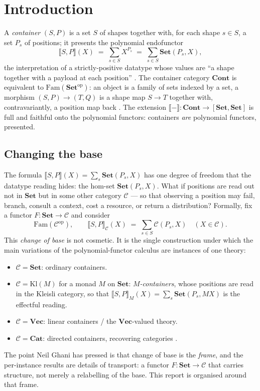 \documentclass[11pt]{amsart}
\theoremstyle{plain}
\theoremstyle{definition}
\theoremstyle{remark}
\newcommand{\Set}{\mathbf{Set}}
\newcommand{\Cont}{\mathbf{Cont}}
\newcommand{\Cat}{\mathbf{Cat}}
\newcommand{\Vect}{\mathbf{Vec}}
\newcommand{\Fam}{\mathrm{Fam}}
\newcommand{\Kl}{\mathrm{Kl}}
\newcommand{\op}{\mathrm{op}}
\newcommand{\ext}[1]{\llbracket #1 \rrbracket}
\newcommand{\extM}[1]{\llbracket #1 \rrbracket_{M}}
\newcommand{\extC}[1]{\llbracket #1 \rrbracket_{\C}}
\newcommand{\C}{\mathcal{C}}
\begin{document}
\section{Introduction}

A \emph{container} $(S,P)$ is a set $S$ of shapes together with, for each shape $s\in S$, a set $P_s$
of positions; it presents the polynomial endofunctor
\[
  \ext{S,P}(X) \;=\; \sum_{s\in S} X^{P_s} \;=\; \sum_{s\in S}\Set(P_s, X),
\]
the interpretation of a strictly-positive datatype whose values are ``a shape together with a payload
at each position'' \cite{AAG}. The container category $\Cont$ is equivalent to $\Fam(\Set^{\op})$: an
object is a family of sets indexed by a set, a morphism $(S,P)\to(T,Q)$ is a shape map $S\to T$
together with, contravariantly, a position map back \cite{NiuSpivak}. The extension
$\ext{-}\colon \Cont \to [\Set,\Set]$ is full and faithful onto the polynomial functors: containers
\emph{are} polynomial functors, presented.

\subsection*{Changing the base}
The formula $\ext{S,P}(X)=\sum_s \Set(P_s,X)$ has one degree of freedom that the datatype reading
hides: the hom-set $\Set(P_s,X)$. What if positions are read out not in $\Set$ but in some other
category $\C$ --- so that observing a position may fail, branch, consult a context, cost a resource,
or return a distribution? Formally, fix a functor $F\colon \Set \to \C$ and consider
\[
  \Fam(\C^{\op}),\qquad \extC{S,P}(X) \;=\; \sum_{s\in S}\C(P_s, X)\quad(X\in\C).
\]
This \emph{change of base} is not cosmetic. It is the single construction under which the main
variations of the polynomial-functor calculus are instances of one theory:
\begin{itemize}[leftmargin=1.6em]
  \item $\C = \Set$: ordinary containers.
  \item $\C = \Kl(M)$ for a monad $M$ on $\Set$: \emph{$M$-containers}, whose positions are read in
    the Kleisli category, so that $\extM{S,P}(X)=\sum_s \Set(P_s, MX)$ is the effectful reading.
  \item $\C = \Vect$: linear containers / the $\Vect$-valued theory.
  \item $\C = \Cat$: directed containers, recovering categories \cite{AhmanUustalu}.
\end{itemize}
The point Neil Ghani has pressed is that change of base is the \emph{frame}, and the per-instance
results are details of transport: a functor $F\colon\Set\to\C$ that carries structure, not merely a
relabelling of the base. This report is organised around that frame.
\end{document}
